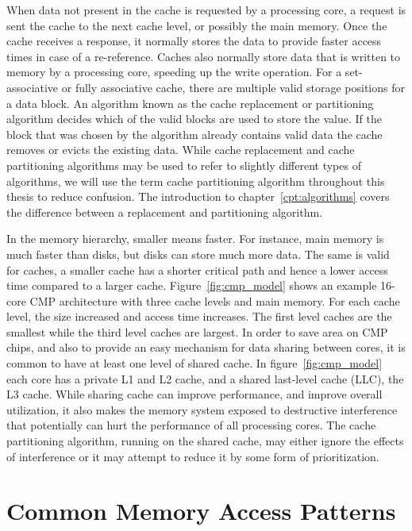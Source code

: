 When data not present in the cache is requested by a processing core, a request is sent the cache to the next cache level, or possibly the main memory.
Once the cache receives a response, it normally stores the data to provide faster access times in case of a re-reference.
Caches also normally store data that is written to memory by a processing core, speeding up the write operation.
For a set-associative or fully associative cache, there are multiple valid storage positions for a data block.
An algorithm known as the cache replacement or partitioning algorithm decides which of the valid blocks are used to store the value.
If the block that was chosen by the algorithm already contains valid data the cache removes or evicts the existing data.
While cache replacement and cache partitioning algorithms may be used to refer to slightly different types of algorithms, we will use the term cache partitioning algorithm throughout this thesis to reduce confusion.
The introduction to chapter~\ref{cpt:algorithms} covers the difference between a replacement and partitioning algorithm.

In the memory hierarchy, smaller means faster. 
For instance, main memory is much faster than disks, but disks can store much more data.
The same is valid for caches, a smaller cache has a shorter critical path and hence a lower access time compared to a larger cache.
Figure~\ref{fig:cmp_model} shows an example 16-core CMP architecture with three cache levels and main memory.
For each cache level, the size increased and access time increases.
The first level caches are the smallest while the third level caches are largest.
In order to save area on CMP chips, and also to provide an easy mechanism for data sharing between cores, it is common to have at least one level of shared cache.
In figure~\ref{fig:cmp_model} each core has a private L1 and L2 cache, and a shared last-level cache (LLC), the L3 cache.
While sharing cache can improve performance, and improve overall utilization, it also makes the memory system exposed to destructive interference that potentially can hurt the performance of all processing cores. 
The cache partitioning algorithm, running on the shared cache, may either ignore the effects of interference or it may attempt to reduce it by some form of prioritization.

\section{Common Memory Access Patterns}

